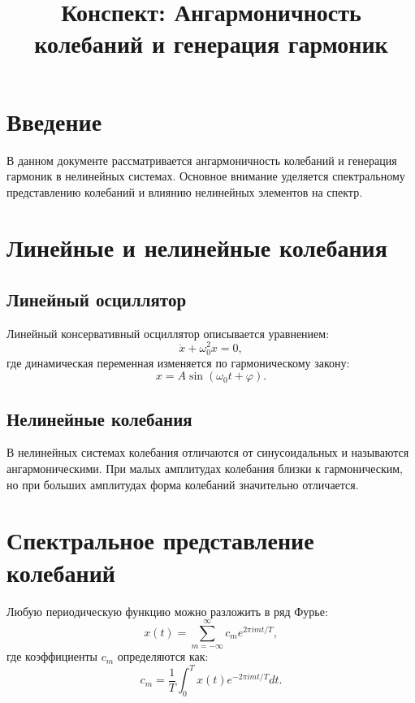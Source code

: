 \documentclass[10pt]{article}
\begin{document}
\title{Конспект: Ангармоничность колебаний и генерация гармоник}
\author{}
\date{}
\maketitle

\section*{Введение}
В данном документе рассматривается ангармоничность колебаний и генерация гармоник в нелинейных системах. Основное внимание уделяется спектральному представлению колебаний и влиянию нелинейных элементов на спектр.

\section{Линейные и нелинейные колебания}
\subsection{Линейный осциллятор}
Линейный консервативный осциллятор описывается уравнением:
\begin{equation}
\ddot{x} + \omega_0^2 x = 0, \tag{3.3}
\end{equation}
где динамическая переменная изменяется по гармоническому закону:
\begin{equation*}
x=A \sin \left(\omega_{0} t+\varphi\right). \tag{3.4}
\end{equation*}

\subsection{Нелинейные колебания}
В нелинейных системах колебания отличаются от синусоидальных и называются ангармоническими. При малых амплитудах колебания близки к гармоническим, но при больших амплитудах форма колебаний значительно отличается.

\section{Спектральное представление колебаний}
Любую периодическую функцию можно разложить в ряд Фурье:
\begin{equation*}
x(t)=\sum_{m=-\infty}^{\infty} c_{m} e^{2 \pi i m t / T}, \tag{3.5}
\end{equation*}
где коэффициенты $c_m$ определяются как:
\begin{equation*}
c_{m}=\frac{1}{T} \int_{0}^{T} x(t) e^{-2 \pi i m t / T} d t. \tag{3.6}
\end{equation*}
\end{document}
